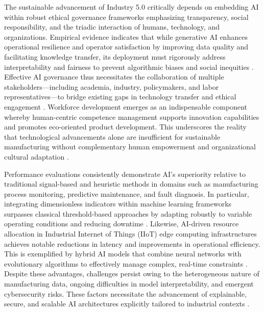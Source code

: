 \documentclass[11pt]{article}
\begin{document}
The sustainable advancement of Industry 5.0 critically depends on embedding AI within robust ethical governance frameworks emphasizing transparency, social responsibility, and the triadic interaction of humans, technology, and organizations. Empirical evidence indicates that while generative AI enhances operational resilience and operator satisfaction by improving data quality and facilitating knowledge transfer, its deployment must rigorously address interpretability and fairness to prevent algorithmic biases and social inequities \cite{ref7,ref18,ref20}. Effective AI governance thus necessitates the collaboration of multiple stakeholders—including academia, industry, policymakers, and labor representatives—to bridge existing gaps in technology transfer and ethical engagement \cite{ref3,ref25,ref38}. Workforce development emerges as an indispensable component whereby human-centric competence management supports innovation capabilities and promotes eco-oriented product development. This underscores the reality that technological advancements alone are insufficient for sustainable manufacturing without complementary human empowerment and organizational cultural adaptation \cite{ref19,ref21}.

Performance evaluations consistently demonstrate AI’s superiority relative to traditional signal-based and heuristic methods in domains such as manufacturing process monitoring, predictive maintenance, and fault diagnosis. In particular, integrating dimensionless indicators within machine learning frameworks surpasses classical threshold-based approaches by adapting robustly to variable operating conditions and reducing downtime \cite{ref4,ref32}. Likewise, AI-driven resource allocation in Industrial Internet of Things (IIoT) edge computing infrastructures achieves notable reductions in latency and improvements in operational efficiency. This is exemplified by hybrid AI models that combine neural networks with evolutionary algorithms to effectively manage complex, real-time constraints \cite{ref31,ref34}. Despite these advantages, challenges persist owing to the heterogeneous nature of manufacturing data, ongoing difficulties in model interpretability, and emergent cybersecurity risks. These factors necessitate the advancement of explainable, secure, and scalable AI architectures explicitly tailored to industrial contexts \cite{ref29,ref35,ref39}.
\end{document}
